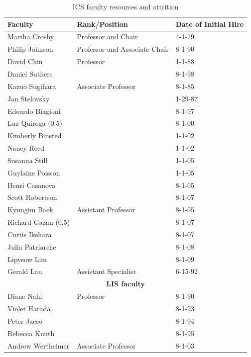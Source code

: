 \documentclass[12pt]{article}
\begin{document}
\begin{table}[htbp]
\begin{center}
\caption{ICS faculty resources and attrition}
\label{fig:faculty}
\begin{tabular}{|l|l|l|} \hline
{\bf Faculty} & {\bf Rank/Position} & {\bf Date of Initial Hire} \\ \hline
Martha Crosby & Professor and Chair & 4-1-79 \\ \hline
Philip Johnson & Professor and Associate Chair & 8-1-90 \\ \hline
David Chin & Professor & 1-1-88 \\
Daniel Suthers &  & 8-1-98  \\ \hline
Kazuo Sugihara & Associate Professor & 8-1-85   \\
Jan Stelovsky &                      & 1-29-87    \\
Edoardo Biagioni &                   & 8-1-97   \\
Luz Quiroga (0.5) &                  & 8-1-00   \\
Kimberly Binsted &                   & 1-1-02   \\
Nancy Reed	 &                   & 1-1-02   \\
Susanna Still &                      & 1-1-05   \\
Guylaine Poisson &                   & 1-1-05   \\
Henri Casanova &                     & 8-1-05   \\
Scott Robertson &                    & 8-1-07   \\ \hline
Kyungim Baek &   Assistant Professor & 8-1-05   \\
Richard Gazan (0.5) &                & 8-1-07   \\
Curtis Ikehara	&                    & 8-1-07   \\
Julia Patriarche &                   & 8-1-08   \\
Lipyeow Lim	&                    & 8-1-09   \\ \hline
Gerald Lau &  Assistant Specialist    & 6-15-92   \\ \hline 
\multicolumn{3}{|c|}{ {\bf LIS faculty} } \\ \hline
Diane Nahl & Professor & 8-1-90 \\
Violet Harada & & 8-1-93 \\
Peter Jacso & & 8-1-94 \\
Rebecca Knuth & &  8-1-95 \\ \hline
Andrew Wertheimer & Associate Professor & 8-1-03 \\ \hline

\end{tabular}
\end{center}
\end{table}
\end{document}
